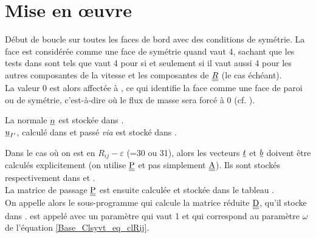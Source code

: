 %
%
%
%
%
%
%
%

\section{Mise en \oe uvre}
\label{Base_Clsyvt_prg_meo}%
D\'ebut de boucle sur toutes les faces de bord  avec des conditions de
sym\'etrie. La face est consid\'er\'ee comme une face de sym\'etrie quand
 vaut 4, sachant que les tests dans 
sont tels que  vaut 4 pour  si et seulement si il vaut aussi
4 pour les autres composantes de la vitesse et les composantes de $\underline{\underline{R}}$ (le
cas \'ech\'eant).\\
La valeur 0 est alors affect\'ee \`a , ce qui identifie la face
comme une face de paroi ou de sym\'etrie, c'est-\`a-dire o\`u le flux de masse
sera forc\'e \`a 0 (cf. ).

La normale $\underline{n}$ est stock\'ee dans .\\
$\underline{u}_{I'}$, calcul\'e dans  et pass\'e {\em via} 
est stock\'e dans .

Dans le cas o\`u on est en $R_{ij}-\varepsilon$ (=30 ou 31),
alors les
vecteurs $\underline{t}$ et $\underline{b}$ doivent \^etre calcul\'es explicitement
(on utilise $\underline{\underline{\textrm{P}}}$ et pas simplement $\underline{\underline{\textrm{A}}}$).
Ils sont stock\'es respectivement dans  et
.\\
La matrice de passage $\underline{\underline{\textrm{P}}}$ est ensuite calcul\'ee et stock\'ee dans le
tableau .\\
On appelle alors le sous-programme  qui calcule la matrice
r\'eduite $\underline{\underline{\textrm{D}}}$, qu'il stocke dans .  est appel\'e
avec un param\`etre  qui vaut 1 et qui correspond au param\`etre
$\omega$ de l'\'equation \ref{Base_Clsyvt_eq_clRij}.


